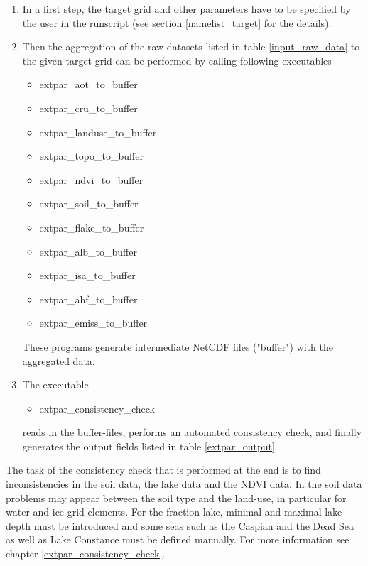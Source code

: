 \documentclass[a4paper,10pt,DIV14,BCOR1cm,titlepage,twoside]{scrartcl}
\begin{document}
\begin{enumerate}
\item In a first step, the target grid and other parameters have to be specified by the user in the runscript (see section \ref{namelist_target} for the details).
\item Then the aggregation of the raw datasets listed in table \ref{input_raw_data} to the given target grid can be performed by calling following executables
  \begin{itemize}
     \item extpar\_aot\_to\_buffer
     \item extpar\_cru\_to\_buffer
     \item extpar\_landuse\_to\_buffer
     \item extpar\_topo\_to\_buffer
     \item extpar\_ndvi\_to\_buffer
     \item extpar\_soil\_to\_buffer
     \item extpar\_flake\_to\_buffer
     \item extpar\_alb\_to\_buffer
     \item extpar\_isa\_to\_buffer
     \item extpar\_ahf\_to\_buffer
     \item extpar\_emiss\_to\_buffer
  \end{itemize}

These programs generate intermediate NetCDF files ("buffer") with the aggregated data.
\item The executable 
\begin{itemize}
     \item extpar\_consistency\_check    
  \end{itemize}
reads in the buffer-files, performs an automated consistency check, and finally generates the output fields listed in table \ref{extpar_output}.
\end{enumerate}

The task of the consistency check that is performed at the end is to find inconsistencies in the soil data, the lake data and the NDVI data. In the soil data problems may appear between the soil type and the land-use, in particular for water and ice grid elements. For the fraction lake, minimal and maximal lake depth must be introduced and some seas such as the Caspian and the Dead Sea as well as Lake Constance must be defined manually. For more information see chapter \ref{extpar_consistency_check}.\par\medskip\noindent
\end{document}
